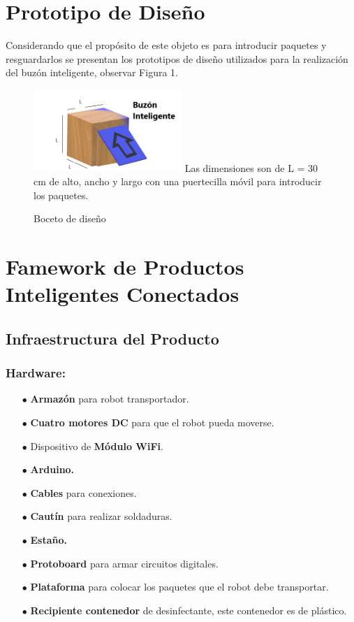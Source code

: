 \documentclass[osajnl,twocolumn,showpacs,superscriptaddress,10pt]{revtex4-1}
\begin{document}
\section{Prototipo de Diseño}
Considerando que el propósito de este objeto es para introducir paquetes y resguardarlos se presentan los prototipos de diseño utilizados para la realización del buzón inteligente, observar Figura 1.


\begin{figure} [H] \centering 
\caption{Boceto de diseño}

\includegraphics[width=0.5\textwidth]{Boceto.png} 
Las dimensiones son de L = 30 cm de alto, ancho y largo con una puertecilla móvil para introducir los paquetes.
\end{figure}

\section{Famework de Productos Inteligentes Conectados}
\subsection{Infraestructura del Producto}
\subsubsection{Hardware:}
\begin{itemize}
    \item[$\bullet$]\textbf{Armazón} para robot transportador.
    \item[$\bullet$]\textbf{Cuatro motores DC} para que el robot pueda moverse.
    \item[$\bullet$]Dispositivo de \textbf{Módulo WiFi}.
    \item[$\bullet$]\textbf{Arduino.}
    \item[$\bullet$]\textbf{Cables} para conexiones.
    \item[$\bullet$]\textbf{Cautín} para realizar soldaduras.
    \item[$\bullet$]\textbf{Estaño.}
    \item[$\bullet$]\textbf{Protoboard} para armar circuitos digitales.
    \item[$\bullet$]\textbf{Plataforma} para colocar los paquetes que el robot debe transportar.
    \item[$\bullet$]\textbf{Recipiente contenedor} de desinfectante, este contenedor es de plástico.
\end{itemize}
\end{document}
